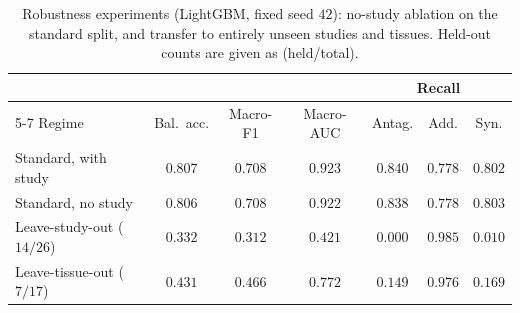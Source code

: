 \documentclass{bmcart}
\begin{document}
\begin{backmatter}
\begin{table}[h!]
\caption{Robustness experiments (LightGBM, fixed seed $42$): no-study ablation on the standard split,
and transfer to entirely unseen studies and tissues. Held-out counts are given as (held/total).}
\label{tab:robust}
\begin{tabular}{lcccccc}
\toprule
 & & & & \multicolumn{3}{c}{Recall} \\
\cmidrule(lr){5-7}
Regime & Bal.\ acc. & Macro-F1 & Macro-AUC & Antag. & Add. & Syn. \\
\midrule
Standard, with study      & $0.807$ & $0.708$ & $0.923$ & $0.840$ & $0.778$ & $0.802$ \\
Standard, no study        & $0.806$ & $0.708$ & $0.922$ & $0.838$ & $0.778$ & $0.803$ \\
Leave-study-out ($14/26$) & $0.332$ & $0.312$ & $0.421$ & $0.000$ & $0.985$ & $0.010$ \\
Leave-tissue-out ($7/17$) & $0.431$ & $0.466$ & $0.772$ & $0.149$ & $0.976$ & $0.169$ \\
\bottomrule
\end{tabular}
\end{table}

\end{backmatter}
\end{document}
